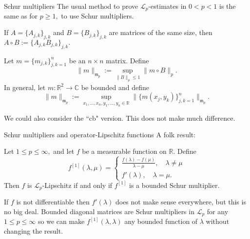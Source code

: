 \documentclass{beamer}
\numberwithin{equation}{section}
\theoremstyle{plain}
\theoremstyle{plain}
\theoremstyle{definition}
\theoremstyle{plain}
\theoremstyle{plain}
\theoremstyle{definition}
\newcommand{\Rl}{\mathbb{R}}
\newcommand{\Cplx}{\mathbb{C}}
\newcommand{\Lc}{\mathcal{L}}
\newcommand{\mf}{\mathfrak{m}}
\begin{document}
\begin{frame}{Schur multipliers}
    The usual method to prove $\Lc_p$-estimates in $0<p<1$ is the same as for $p\geq 1,$ to use Schur multipliers.

    If $A = \{A_{j,k}\}_{j,k}$ and $B = \{B_{j,k}\}_{j,k}$ are matrices of the same size, then $A\circ B := \{A_{j,k}B_{j,k}\}_{j,k}.$

    \begin{definition}
        Let $m = \{m_{j,k}\}_{j,k=1}^n$ be an $n\times n$ matrix. Define
        \[
            \|m\|_{\mf_p} := \sup_{\|B\|_{p}\leq 1} \|m\circ B\|_p.
        \]
        In general, let $m:\Rl^2\to \Cplx$ be bounded and define
        \[
            \|m\|_{\mf_p} := \sup_{x_1,\ldots,x_n,y_1,\ldots,y_n\in \Rl} \|\{m(x_j,y_k)\}_{j,k=1}^n\|_{\mf_p}.
        \]
    \end{definition}
    We could also consider the ``cb" version. This does not make much difference.
\end{frame}

\begin{frame}{Schur multipliers and operator-Lipschitz functions}
    A folk result:
    \begin{theorem}
        Let $1\leq p\leq \infty,$ and let $f$ be a measurable function on $\Rl.$ Define
        \[
            f^{[1]}(\lambda,\mu) = \begin{cases}
                                        \frac{f(\lambda)-f(\mu)}{\lambda-\mu},\quad \lambda \neq \mu\\
                                        f'(\lambda),\quad \lambda=\mu.
                                   \end{cases}
        \]
        Then $f$ is $\Lc_p$-Lipschitz if and only if $f^{[1]}$ is a bounded Schur multiplier.
    \end{theorem}
    \pause
    If $f$ is not differentiable then $f'(\lambda)$ does not make sense everywhere, but this is no big deal. Bounded diagonal matrices are Schur multipliers in $\Lc_p$
    for any $1\leq p\leq \infty$ so we can make $f^{[1]}(\lambda,\lambda)$ any bounded function of $\lambda$ without changing the result.
\end{frame}
\end{document}
